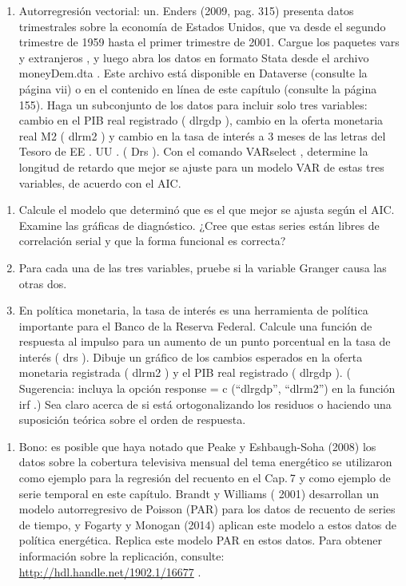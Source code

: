 \documentclass[
]{book}
\providecommand{\tightlist}{%
  \setlength{\itemsep}{0pt}\setlength{\parskip}{0pt}}
\begin{document}
\begin{enumerate}
\def\labelenumi{\arabic{enumi}.}
\setcounter{enumi}{3}
\tightlist
\item
  Autorregresión vectorial:
  un.
  Enders (2009, pag. 315) presenta datos trimestrales sobre la economía de Estados Unidos, que va desde el segundo trimestre de 1959 hasta el primer trimestre de 2001. Cargue los paquetes vars y extranjeros , y luego abra los datos en formato Stata desde el archivo moneyDem.dta . Este archivo está disponible en Dataverse (consulte la página vii) o en el contenido en línea de este capítulo (consulte la página 155). Haga un subconjunto de los datos para incluir solo tres variables: cambio en el PIB real registrado ( dlrgdp ), cambio en la oferta monetaria real M2 ( dlrm2 ) y cambio en la tasa de interés a 3 meses de las letras del Tesoro de EE . UU . ( Drs ). Con el comando VARselect , determine la longitud de retardo que mejor se ajuste para un modelo VAR de estas tres variables, de acuerdo con el AIC.
\end{enumerate}

\begin{enumerate}
\def\labelenumi{\Alph{enumi}.}
\setcounter{enumi}{1}
\item
  Calcule el modelo que determinó que es el que mejor se ajusta según el AIC. Examine las gráficas de diagnóstico. ¿Cree que estas series están libres de correlación serial y que la forma funcional es correcta?
\item
  Para cada una de las tres variables, pruebe si la variable Granger causa las otras dos.
\item
  En política monetaria, la tasa de interés es una herramienta de política importante para el Banco de la Reserva Federal. Calcule una función de respuesta al impulso para un aumento de un punto porcentual en la tasa de interés ( drs ). Dibuje un gráfico de los cambios esperados en la oferta monetaria registrada ( dlrm2 ) y el PIB real registrado ( dlrgdp ). ( Sugerencia: incluya la opción response = c (``dlrgdp'', ``dlrm2'') en la función irf .) Sea claro acerca de si está ortogonalizando los residuos o haciendo una suposición teórica sobre el orden de respuesta.
\end{enumerate}

\begin{enumerate}
\def\labelenumi{\arabic{enumi}.}
\setcounter{enumi}{4}
\tightlist
\item
  Bono: es posible que haya notado que Peake y Eshbaugh-Soha (2008) los datos sobre la cobertura televisiva mensual del tema energético se utilizaron como ejemplo para la regresión del recuento en el Cap. 7 y como ejemplo de serie temporal en este capítulo. Brandt y Williams ( 2001) desarrollan un modelo autorregresivo de Poisson (PAR) para los datos de recuento de series de tiempo, y Fogarty y Monogan (2014) aplican este modelo a estos datos de política energética. Replica este modelo PAR en estos datos. Para obtener información sobre la replicación, consulte: \url{http://hdl.handle.net/1902.1/16677} .
\end{enumerate}
\end{document}
